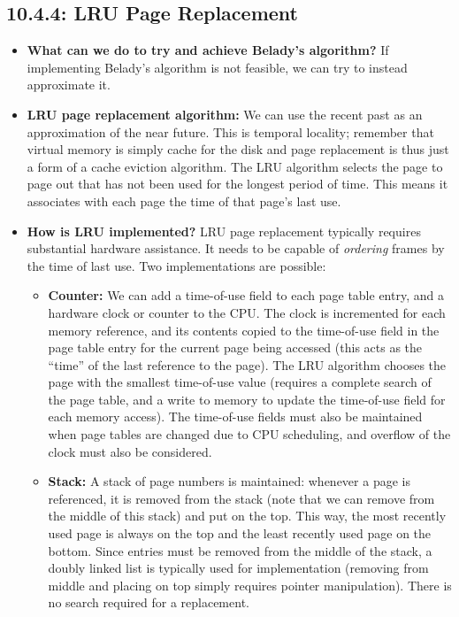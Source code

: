 \documentclass[12pt]{article}
\begin{document}
\subsection*{10.4.4: LRU Page Replacement}

\begin{itemize}
    \item \textbf{What can we do to try and achieve Belady's algorithm?} If implementing Belady's algorithm is not feasible, we can try to instead approximate it.
    \item \textbf{LRU page replacement algorithm:} We can use the recent past as an approximation of the near future. This is temporal locality; remember that virtual memory is simply cache for the disk and page replacement is thus just a form of a cache eviction algorithm. The LRU algorithm selects the page to page out that has not been used for the longest period of time. This means it associates with each page the time of that page's last use.
    \item \textbf{How is LRU implemented?} LRU page replacement typically requires substantial hardware assistance. It needs to be capable of \textit{ordering} frames by the time of last use. Two implementations are possible:
        \begin{itemize}
            \item \textbf{Counter:} We can add a time-of-use field to each page table entry, and a hardware clock or counter to the CPU. The clock is incremented for each memory reference, and its contents copied to the time-of-use field in the page table entry for the current page being accessed (this acts as the ``time'' of the last reference to the page). The LRU algorithm chooses the page with the smallest time-of-use value (requires a complete search of the page table, and a write to memory to update the time-of-use field for each memory access). The time-of-use fields must also be maintained when page tables are changed due to CPU scheduling, and overflow of the clock must also be considered.
            \item \textbf{Stack:} A stack of page numbers is maintained: whenever a page is referenced, it is removed from the stack (note that we can remove from the middle of this stack) and put on the top. This way, the most recently used page is always on the top and the least recently used page on the bottom. Since entries must be removed from the middle of the stack, a doubly linked list is typically used for implementation (removing from middle and placing on top simply requires pointer manipulation). There is no search required for a replacement.

\end{itemize}
\end{itemize}
\end{document}
